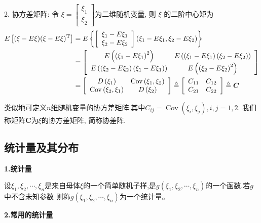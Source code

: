 2. 协方差矩阵: 令 $\xi=\left[\begin{array}{l}\xi_{1} \\ \xi_{2}\end{array}\right] $为二维随机变量, 则 $\xi$ 的二阶中心矩为
\begin{align}
E\left[(\xi-E \xi)(\xi-E \xi)^{\mathrm{T}}\right] 
	& = E\left\{\left[\begin{array}{c}
		\xi_{1}-E \xi_{1} \\
		\xi_{2}-E \xi_{2}
		\end{array}\right]\left(\xi_{1}-E \xi_{1}, \xi_{2}-E \xi_{2}\right)\right\} \notag \\
	& = \left[\begin{array}{cc}
	E\left(\left(\xi_{1}-E \xi_{1}\right)^{2}\right) & E\left(\left(\xi_{1}-E \xi_{1}\right)	\left(\xi_{2}-E \xi_{2}\right)\right) \\
		E\left(\left(\xi_{2}-E \xi_{2}\right)\left(\xi_{1}-E \xi_{1}\right)\right) & E\left(\left(\xi_{2}-E \xi_{2}\right)^{2}\right)
	\end{array}\right] \notag \\
	& = \left[\begin{array}{cc}
	D\left(\xi_{1}\right) & \operatorname{Cov}\left(\xi_{1}, \xi_{2}\right) \\
	\operatorname{Cov}\left(\xi_{2}, \xi_{1}\right) & D\left(\xi_{2}\right)
	\end{array}\right]
	\triangleq\left[\begin{array}{cc}
	C_{11} & C_{12} \\
	C_{21} & C_{22}
	\end{array}\right] 
	\triangleq \boldsymbol{C}\notag
\end{align}

类似地可定义$n$维随机变量的协方差矩阵.其中$C_{i j}=\operatorname{Cov}\left(\xi_{i}, \xi_{j}\right), i, j=1,2 $. 我们称矩阵$\boldsymbol{C}$为$\xi$的协方差矩阵, 简称协差阵.


\subsection{统计量及其分布}
{\bf 1.统计量}

设$\xi_1, \xi_2, \cdots,\xi_n$是来自母体$\xi$的一个简单随机子样,是$g(\xi_1, \xi_2, \cdots,\xi_n)$的一个函数.若$g$中不含未知参数 则称$g(\xi_1, \xi_2, \cdots,\xi_n)$为一个统计量。

{\bf 2.常用的统计量}

